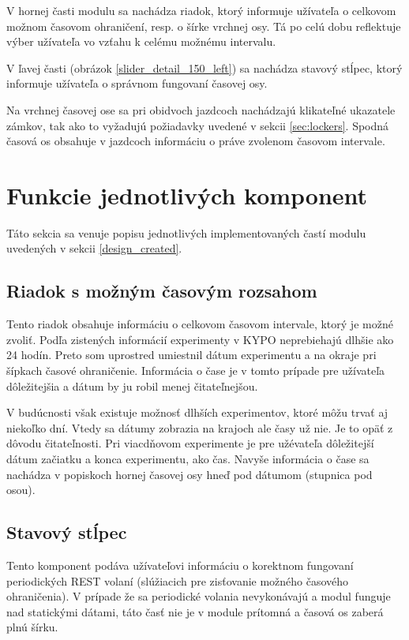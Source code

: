 \documentclass[
  digital, %
  twoside, %
  notable,   %
  nolof,   %
  nolot,   %
]{fithesis3}
\begin{document}
V hornej časti modulu sa nachádza riadok, ktorý informuje užívateľa o celkovom možnom časovom ohraničení, resp. o šírke vrchnej osy. Tá po celú dobu reflektuje výber užívateľa vo vzťahu k celému možnému intervalu.

V ľavej časti (obrázok \ref{slider_detail_150_left}) sa nachádza stavový stĺpec, ktorý informuje užívateľa o správnom fungovaní časovej osy.

Na vrchnej časovej ose sa pri obidvoch jazdcoch nachádzajú klikateľné ukazatele zámkov, tak ako to vyžadujú požiadavky uvedené v sekcii \ref{sec:lockers}. Spodná časová os obsahuje v jazdcoch informáciu o práve zvolenom časovom intervale.

\section{Funkcie jednotlivých komponent}
Táto sekcia sa venuje popisu jednotlivých implementovaných častí modulu uvedených v sekcii \ref{design_created}.

\subsection{Riadok s možným časovým rozsahom}
Tento riadok obsahuje informáciu o celkovom časovom intervale, ktorý je možné zvoliť. Podľa zistených informácií experimenty v KYPO neprebiehajú dlhšie ako 24 hodín. Preto som uprostred umiestnil dátum experimentu a na okraje pri šípkach časové ohraničenie. Informácia o čase je v tomto prípade pre užívateľa dôležitejšia a dátum by ju robil menej čitateľnejšou.

V budúcnosti však existuje možnosť dlhších experimentov, ktoré môžu trvať aj niekoľko dní. Vtedy sa dátumy zobrazia na krajoch ale časy už nie. Je to opäť z dôvodu čitateľnosti. Pri viacdňovom experimente je pre užévateľa dôležitejší dátum začiatku a konca experimentu, ako čas. Navyše informácia o čase sa nachádza v popiskoch hornej časovej osy hneď pod dátumom (stupnica pod osou).

\subsection{Stavový stĺpec}
Tento komponent podáva užívateľovi informáciu o korektnom fungovaní periodických REST volaní (slúžiacich pre zisťovanie možného časového ohraničenia). V prípade že sa periodické volania nevykonávajú a modul funguje nad statickými dátami, táto časť nie je v module prítomná a časová os zaberá plnú šírku.
\end{document}
